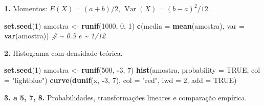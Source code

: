 \documentclass[
  portuguese,
  11pt,
  openany]{book}
\newenvironment{Shaded}{\begin{snugshade}}{\end{snugshade}}
\newcommand{\AttributeTok}[1]{\textcolor[rgb]{0.13,0.29,0.53}{#1}}
\newcommand{\CommentTok}[1]{\textcolor[rgb]{0.56,0.35,0.01}{\textit{#1}}}
\newcommand{\ConstantTok}[1]{\textcolor[rgb]{0.56,0.35,0.01}{#1}}
\newcommand{\DecValTok}[1]{\textcolor[rgb]{0.00,0.00,0.81}{#1}}
\newcommand{\FunctionTok}[1]{\textcolor[rgb]{0.13,0.29,0.53}{\textbf{#1}}}
\newcommand{\NormalTok}[1]{#1}
\newcommand{\OtherTok}[1]{\textcolor[rgb]{0.56,0.35,0.01}{#1}}
\newcommand{\SpecialCharTok}[1]{\textcolor[rgb]{0.81,0.36,0.00}{\textbf{#1}}}
\newcommand{\StringTok}[1]{\textcolor[rgb]{0.31,0.60,0.02}{#1}}
\begin{document}
\textbf{1.} Momentos: \(E(X) = (a+b)/2\), \(\operatorname{Var}(X) = (b-a)^2/12\).

\begin{Shaded}
\begin{Highlighting}[]
\FunctionTok{set.seed}\NormalTok{(}\DecValTok{1}\NormalTok{)}
\NormalTok{amostra }\OtherTok{\textless{}{-}} \FunctionTok{runif}\NormalTok{(}\DecValTok{1000}\NormalTok{, }\DecValTok{0}\NormalTok{, }\DecValTok{1}\NormalTok{)}
\FunctionTok{c}\NormalTok{(}\AttributeTok{media =} \FunctionTok{mean}\NormalTok{(amostra), }\AttributeTok{var =} \FunctionTok{var}\NormalTok{(amostra))   }\CommentTok{\# \textasciitilde{} 0.5 e \textasciitilde{} 1/12}
\end{Highlighting}
\end{Shaded}

\textbf{2.} Histograma com densidade teórica.

\begin{Shaded}
\begin{Highlighting}[]
\FunctionTok{set.seed}\NormalTok{(}\DecValTok{1}\NormalTok{)}
\NormalTok{amostra }\OtherTok{\textless{}{-}} \FunctionTok{runif}\NormalTok{(}\DecValTok{500}\NormalTok{, }\SpecialCharTok{{-}}\DecValTok{3}\NormalTok{, }\DecValTok{7}\NormalTok{)}
\FunctionTok{hist}\NormalTok{(amostra, }\AttributeTok{probability =} \ConstantTok{TRUE}\NormalTok{, }\AttributeTok{col =} \StringTok{"lightblue"}\NormalTok{)}
\FunctionTok{curve}\NormalTok{(}\FunctionTok{dunif}\NormalTok{(x, }\SpecialCharTok{{-}}\DecValTok{3}\NormalTok{, }\DecValTok{7}\NormalTok{), }\AttributeTok{col =} \StringTok{"red"}\NormalTok{, }\AttributeTok{lwd =} \DecValTok{2}\NormalTok{, }\AttributeTok{add =} \ConstantTok{TRUE}\NormalTok{)}
\end{Highlighting}
\end{Shaded}

\textbf{3. a 5, 7, 8.} Probabilidades, transformações lineares e comparação empírica.
\end{document}
